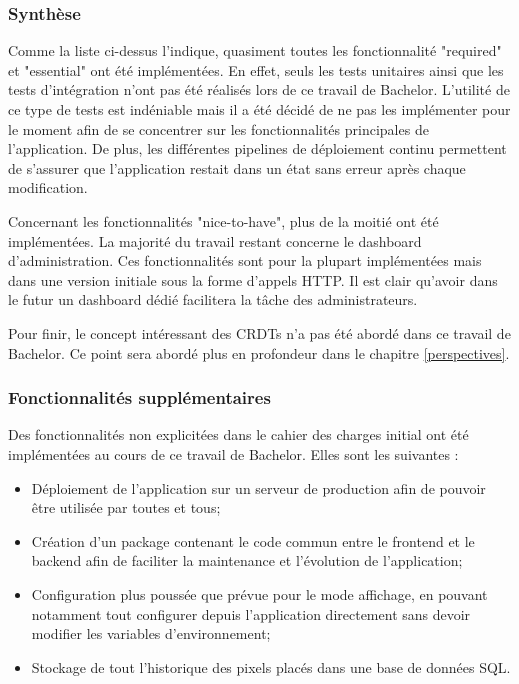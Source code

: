 \subsubsection{Synthèse}

Comme la liste ci-dessus l'indique, quasiment toutes les fonctionnalité "required" et "essential" ont été implémentées. En effet, seuls les tests unitaires ainsi que les tests d'intégration n'ont pas été réalisés lors de ce travail de Bachelor. L'utilité de ce type de tests est indéniable mais il a été décidé de ne pas les implémenter pour le moment afin de se concentrer sur les fonctionnalités principales de l'application. De plus, les différentes pipelines de déploiement continu permettent de s'assurer que l'application restait dans un état sans erreur après chaque modification.

Concernant les fonctionnalités "nice-to-have", plus de la moitié ont été implémentées. La majorité du travail restant concerne le dashboard d'administration. Ces fonctionnalités sont pour la plupart implémentées mais dans une version initiale sous la forme d'appels HTTP. Il est clair qu'avoir dans le futur un dashboard dédié facilitera la tâche des administrateurs.

Pour finir, le concept intéressant des CRDTs n'a pas été abordé dans ce travail de Bachelor. Ce point sera abordé plus en profondeur dans le chapitre \ref{perspectives}.

\subsubsection{Fonctionnalités supplémentaires}

Des fonctionnalités non explicitées dans le cahier des charges initial ont été implémentées au cours de ce travail de Bachelor. Elles sont les suivantes :


\begin{itemize}
  \item Déploiement de l'application sur un serveur de production afin de pouvoir être utilisée par toutes et tous;
  \item Création d'un package contenant le code commun entre le frontend et le backend afin de faciliter la maintenance et l'évolution de l'application;
  \item Configuration plus poussée que prévue pour le mode affichage, en pouvant notamment tout configurer depuis l'application directement sans devoir modifier les variables d'environnement;
  \item Stockage de tout l'historique des pixels placés dans une base de données SQL.
\end{itemize}

